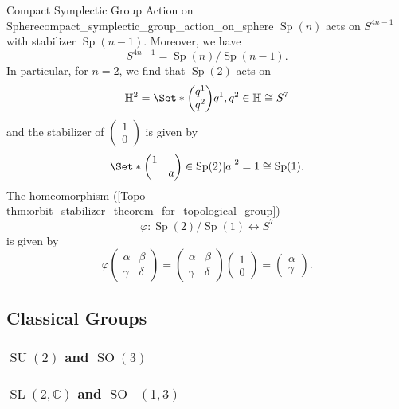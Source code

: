 \documentclass{article}
\begin{document}
\begin{example}{Compact Symplectic Group Action on Sphere}{compact_symplectic_group_action_on_sphere}
    $\operatorname{Sp}(n)$ acts on $S^{4n-1}$ with stabilizer $\operatorname{Sp}(n-1)$.
    Moreover, we have
    \[ S^{4n-1} = \operatorname{Sp}(n)/\operatorname{Sp}(n-1). \]
    In particular, for $n=2$, we find that $\operatorname{Sp}(2)$ acts on
    \[ \mathbb{H}^2 = \Set*{\begin{pmatrix}
        q^1 \\ q^2
    \end{pmatrix}}{q^1,q^2\in\mathbb{H}} \cong S^7 \]
    and the stabilizer of $\begin{pmatrix}
        1 \\ 0
    \end{pmatrix}$ is given by
    \[ \Set*{\begin{pmatrix}
        1 & \\ & a
    \end{pmatrix}\in\operatorname{Sp}(2)}{\abs{a}^2 = 1} \cong \operatorname{Sp}(1). \]
    The homeomorphism (\cref{Topo-thm:orbit_stabilizer_theorem_for_topological_group})
    \[ \varphi: \operatorname{Sp}(2)/\operatorname{Sp}(1) \longleftrightarrow S^7 \]
    is given by
    \[ \varphi\begin{pmatrix}
        \alpha & \beta \\ \gamma & \delta
    \end{pmatrix} = \begin{pmatrix}
        \alpha & \beta \\ \gamma & \delta
    \end{pmatrix} \begin{pmatrix}
        1 \\ 0
    \end{pmatrix} = \begin{pmatrix}
        \alpha \\ \gamma
    \end{pmatrix}. \]
\end{example}

\subsection{Classical Groups}

\subsubsection{\texorpdfstring{$\operatorname{SU}(2)$ and $\operatorname{SO}(3)$}{SU(2) and SO(3)}}

\subsubsection{\texorpdfstring{$\operatorname{SL}(2,\mathbb{C})$ and $\operatorname{SO}^+(1,3)$}{SL(2) and SO+(1,3)}}

% 
% 
\end{document}
